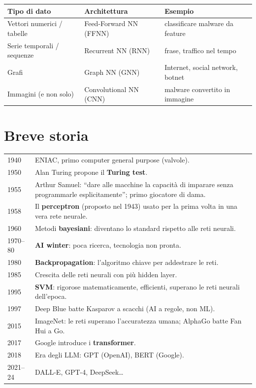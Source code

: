 \begin{center}
\small
\begin{tabular}{lll}
\toprule
\textbf{Tipo di dato} & \textbf{Architettura} & \textbf{Esempio}\\
\midrule
Vettori numerici / tabelle & Feed-Forward NN (FFNN) & classificare malware da feature\\
Serie temporali / sequenze & Recurrent NN (RNN) & frase, traffico nel tempo\\
Grafi & Graph NN (GNN) & Internet, social network, botnet\\
Immagini (e non solo) & Convolutional NN (CNN) & malware convertito in immagine\\
\bottomrule
\end{tabular}
\end{center}

\section{Breve storia}
\begin{center}
\small
\begin{tabularx}{\textwidth}{l X}
\toprule
1940 & ENIAC, primo computer general purpose (valvole).\\
1950 & Alan Turing propone il \textbf{Turing test}.\\
1955 & Arthur Samuel: ``dare alle macchine la capacità di imparare senza programmarle esplicitamente''; primo giocatore di dama.\\
1958 & Il \textbf{perceptron} (proposto nel 1943) usato per la prima volta in una vera rete neurale.\\
1960 & Metodi \textbf{bayesiani}: diventano lo standard rispetto alle reti neurali.\\
1970--80 & \textbf{AI winter}: poca ricerca, tecnologia non pronta.\\
1980 & \textbf{Backpropagation}: l'algoritmo chiave per addestrare le reti.\\
1985 & Crescita delle reti neurali con più hidden layer.\\
1995 & \textbf{SVM}: rigorose matematicamente, efficienti, superano le reti neurali dell'epoca.\\
1997 & Deep Blue batte Kasparov a scacchi (AI a regole, non ML).\\
2015 & ImageNet: le reti superano l'accuratezza umana; AlphaGo batte Fan Hui a Go.\\
2017 & Google introduce i \textbf{transformer}.\\
2018 & Era degli LLM: GPT (OpenAI), BERT (Google).\\
2021--24 & DALL-E, GPT-4, DeepSeek\ldots\\
\bottomrule
\end{tabularx}
\end{center}

